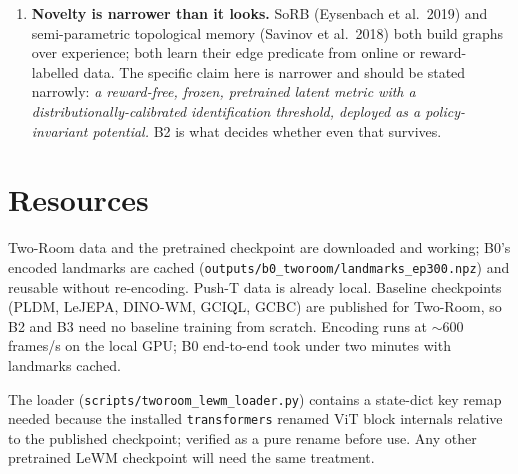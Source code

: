 \documentclass[11pt]{article}
\begin{document}
\begin{enumerate}[leftmargin=1.4em,itemsep=3pt]
in the pixel observation, so same-position pairs from different episodes are typically executing
unrelated goal-directed policies. The false-edge problem itself is real and unresolved; this
particular fix does not solve it here, and should not be assumed to transfer to an environment
where the goal is visible.
\item \textbf{Novelty is narrower than it looks.} SoRB (Eysenbach et al.\ 2019) and semi-parametric
topological memory (Savinov et al.\ 2018) both build graphs over experience; both learn their edge
predicate from online or reward-labelled data. The specific claim here is narrower and should be
stated narrowly: \emph{a reward-free, frozen, pretrained latent metric with a
distributionally-calibrated identification threshold, deployed as a policy-invariant potential.}
B2 is what decides whether even that survives.
\end{enumerate}

\section{Resources}

Two-Room data and the pretrained checkpoint are downloaded and working; B0's encoded landmarks
are cached (\texttt{outputs/b0\_tworoom/landmarks\_ep300.npz}) and reusable without re-encoding.
Push-T data is already local. Baseline checkpoints (PLDM, LeJEPA, DINO-WM, GCIQL, GCBC) are
published for Two-Room, so B2 and B3 need no baseline training from scratch. Encoding runs at
$\sim$600 frames/s on the local GPU; B0 end-to-end took under two minutes with landmarks cached.

The loader (\texttt{scripts/tworoom\_lewm\_loader.py}) contains a state-dict key remap needed
because the installed \texttt{transformers} renamed ViT block internals relative to the
published checkpoint; verified as a pure rename before use. Any other pretrained LeWM checkpoint
will need the same treatment.
\end{document}
